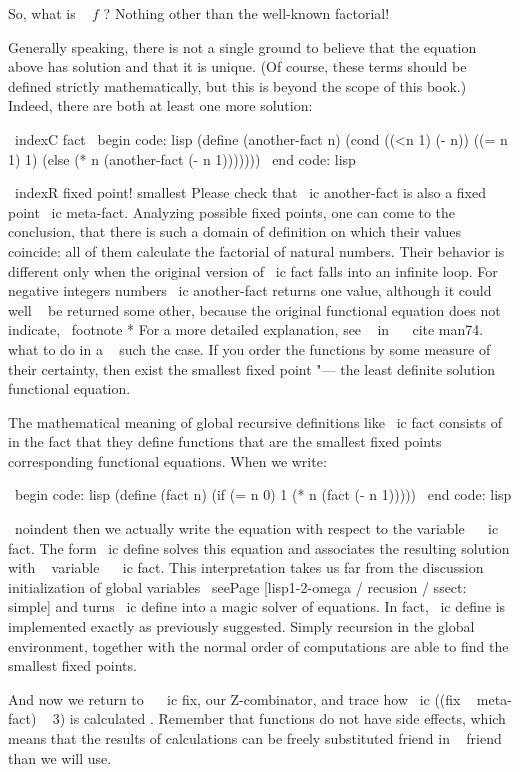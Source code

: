 {So, what is ~ $ f $ ? Nothing other than the well-known factorial!

Generally speaking, there is not a single ground to believe that the equation above has
solution and that it is unique. (Of course, these terms should be defined strictly
mathematically, but this is beyond the scope of this book.) Indeed, there are both
at least one more solution:

\ indexC {fact}
\ begin {code: lisp}
(define (another-fact n)
  (cond ((<n 1) (- n))
        ((= n 1) 1)
        (else (* n (another-fact (- n 1)))))))
\ end {code: lisp}

\ indexR {fixed point! smallest}
Please check that \ ic {another-fact} is also a fixed point
\ ic {meta-fact}. Analyzing possible fixed points, one can come to the conclusion,
that there is such a domain of definition on which their values ​​coincide: all of them
calculate the factorial of natural numbers. Their behavior is different only when
the original version of \ ic {fact} falls into an infinite loop. For negative integers
numbers \ ic {another-fact} returns one value, although it could well ~ be returned
some other, because the original functional equation does not indicate, %
\ footnote * {For a more detailed explanation, see ~ in ~ \ cite {man74}.} what to do in a ~ such
the case. If you order the functions by some measure of their certainty, then
exist the smallest fixed point "--- the least definite solution
functional equation.

The mathematical meaning of global recursive definitions like \ ic {fact} consists of
in the fact that they define functions that are the smallest fixed points
corresponding functional equations. When we write:

\ begin {code: lisp}
(define (fact n)
  (if (= n 0) 1
      (* n (fact (- n 1)))))
\ end {code: lisp}

\ noindent
then we actually write the equation with respect to the variable ~ \ ic {fact}. The form
\ ic {define} solves this equation and associates the resulting solution
with ~ variable ~ \ ic {fact}. This interpretation takes us far from the discussion
initialization of global variables
\ seePage [lisp1-2-omega / recusion / ssect: simple]
and turns \ ic {define} into a magic solver of equations. In fact,
\ ic {define} is implemented exactly as previously suggested. Simply recursion
in the global environment, together with the normal order of computations
are able to find the smallest fixed points.

And now we return to ~ \ ic {fix}, our Z-combinator, and trace how
\ ic {((fix ~ meta-fact) ~ 3)} is calculated . Remember that functions do not have
side effects, which means that the results of calculations can be freely substituted
friend in ~ friend than we will use.

}
